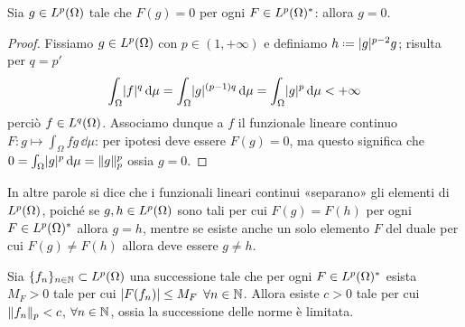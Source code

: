 \begin{lemma} \label{l:funzionali-separano-Lp}
    Sia $g\in\leb[p]{\Omega}$ tale che $F(g)=0$ per ogni $F\in\dual{\leb[p]{\Omega}}$: allora $g=0$.
\end{lemma}
\begin{proof}
    Fissiamo $g\in\leb[p]{\Omega}$ con $p\in(1,+\infty)$ e definiamo $h\defeq\abs{g}^{p-2}g$; risulta per $q=p'$
    \begin{equation}
        \int_\Omega \abs{f}^q\,\dd\mu=
        \int_\Omega \abs{g}^{(p-1)q}\,\dd\mu=
        \int_\Omega \abs{g}^p\,\dd\mu<
        +\infty
    \end{equation}
    perciò $f\in\leb[q]{\Omega}$.
    Associamo dunque a $f$ il funzionale lineare continuo $F\colon g\mapsto\int_\Omega fg\,\dd\mu$: per ipotesi deve essere $F(g)=0$, ma questo significa che $0=\int_\Omega\abs{g}^p\,\dd\mu=\norm{g}_p^p$ ossia $g=0$.
\end{proof}
In altre parole si dice che i funzionali lineari continui «separano» gli elementi di $\leb[p]{\Omega}$, poich\'e se $g,h\in\leb[p]{\Omega}$ sono tali per cui $F(g)=F(h)$ per ogni $F\in\dual{\leb[p]{\Omega}}$ allora $g=h$, mentre se esiste anche un solo elemento $F$ del duale per cui $F(g)\ne F(h)$ allora deve essere $g\ne h$.
\begin{teorema} \label{t:limitatezza-uniforme}
    Sia $\{f_n\}_{n\in\N}\subset\leb[p]{\Omega}$ una successione tale che per ogni $F\in\dual{\leb[p]{\Omega}}$ esista $M_F>0$ tale per cui $\abs{F(f_n)}\le M_F$ $\forall n\in\N$.
    Allora esiste $c>0$ tale per cui $\norm{f_n}_p<c$, $\forall n\in\N$, ossia la successione delle norme è limitata.
\end{teorema}
